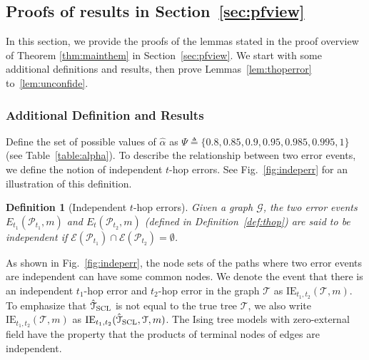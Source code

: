 \documentclass[11pt,onecolumn]{article}
\newcommand{\calE}{\mathcal{E}}
\newcommand{\calG}{\mathcal{G}}
\newcommand{\calP}{\mathcal{P}}
\newcommand{\calT}{\mathcal{T}}
\newcommand{\hatcalT}{\hat{\calT}}
\newcommand{\halpha}{\hat{\alpha}}
\newtheorem{definition}{Definition}
\begin{document}
\subsection{Proofs of results in Section~\ref{sec:pfview}}
In this section, we provide the proofs of the lemmas stated in the proof overview of Theorem \ref{thm:mainthem} in Section~\ref{sec:pfview}. We start with some additional definitions and results, then prove Lemmas~\ref{lem:thoperror} to~\ref{lem:unconfide}. 
\subsubsection{Additional Definition and Results}
  Define the set of possible values of $\halpha$ as  $\Psi\triangleq\{0.8,0.85,0.9,0.95,0.985,0.995,1\}$ (see Table~\ref{table:alpha}). To describe the relationship between two error events, we define the notion of independent $t$-hop errors. See Fig.~\ref{fig:indeperr} for an illustration of this definition.
\begin{definition}[Independent $t$-hop errors]
	Given a graph $\calG$, the two error events $E_{t_{1}}(\calP_{t_{1}},m)$ and $E_{t}(\calP_{t_{2}},m)$ (defined in Definition~\ref{def:thop}) are said to be {\em independent}  if $\calE (\calP_{t_{1}} )\cap\calE (\calP_{t_{2}} )= \emptyset$. 
\end{definition}
As shown in Fig.~\ref{fig:indeperr}, the node sets of the paths where two error events are independent can have some common nodes. We denote the event that there is an independent $t_{1}$-hop error and $t_{2}$-hop error in the graph $\calT$ as $\mathrm{IE}_{t_{1},t_{2}}(\calT,m)$. To emphasize that $\hatcalT_{{\rm SCL}}$ is not equal to the true tree $\calT$, we also write $\mathrm{IE}_{t_{1},t_{2}}(\calT,m)$ as $\mathrm{IE}_{t_{1},t_{2}}(\hatcalT_{{\rm SCL}},\calT,m)$.
The Ising tree models with zero-external field have the property that the products of terminal nodes of edges are independent\cite{nikolakakis2021predictive}.
\end{document}
